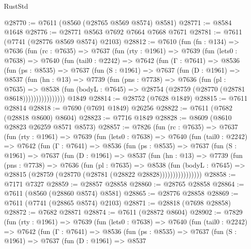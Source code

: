 \begin{lexlean}{RustStd}
\begin{coremodule}
@28770 := @7611 (@8560 (@28765 @8569 @8574) @8581)
@28771 := @8584 @1648
@28776 := @28771 @8563 @7692 @7664 @7668 @7671
@28781 := @7611 (@7741 (@28776 @8569 @8574) @2103)
@28812 := @7610
    (fun (fn : @134) =>
    @7636
      (fun (rc : @7635) =>
      @7637
        (fun (rty : @1961) =>
        @7639
          (fun (lets0 : @7638) =>
          @7640
            (fun (tail0 : @2242) =>
            @7642
              (fun (Γ : @7641) =>
              @8536
                (fun (ps : @8535) =>
                @7637
                  (fun (S : @1961) =>
                  @7637
                    (fun (D : @1961) =>
                    @8537
                      (fun (hn : @13) =>
                      @7739
                        (fun (pns : @7738) =>
                        @7636
                          (fun (pl : @7635) =>
                          @8538
                            (fun (bodyL : @7645) =>
                            @28754 (@28759 (@28770 (@28781 @8618))))))))))))))))
    @1849
@28814 := @28752 (@7628 @1849)
@28815 := @7611 @28814
@28818 := @7690 (@7691 @1849) @26256
@28822 := @7611 (@7682 (@28818 @8600) @8604)
@28823 := @7716 @1849
@28828 := @8609 (@8610 @28823 @26259 @8571 @8573)
@28857 := @7826
    (fun (rc : @7635) =>
    @7637
      (fun (rty : @1961) =>
      @7639
        (fun (lets0 : @7638) =>
        @7640
          (fun (tail0 : @2242) =>
          @7642
            (fun (Γ : @7641) =>
            @8536
              (fun (ps : @8535) =>
              @7637
                (fun (S : @1961) =>
                @7637
                  (fun (D : @1961) =>
                  @8537
                    (fun (hn : @13) =>
                    @7739
                      (fun (pns : @7738) =>
                      @7636
                        (fun (pl : @7635) =>
                        @8538
                          (fun (bodyL : @7645) =>
                          @28815 (@28759 (@28770 (@28781 (@28822 @28828))))))))))))))))
@28858 := @7171 @7327
@28859 := @28857 @28858
@28860 := @28765 @28858
@28864 := @7611 (@8560 (@28860 @8574) @8581)
@28865 := @28776 @28858
@28869 := @7611 (@7741 (@28865 @8574) @2103)
@28871 := @28818 (@7698 @28858)
@28872 := @7682 @28871
@28874 := @7611 (@28872 @8604)
@28902 := @7829
    (fun (rty : @1961) =>
    @7639
      (fun (lets0 : @7638) =>
      @7640
        (fun (tail0 : @2242) =>
        @7642
          (fun (Γ : @7641) =>
          @8536
            (fun (ps : @8535) =>
            @7637
              (fun (S : @1961) =>
              @7637
                (fun (D : @1961) =>
                @8537

\end{coremodule}
\end{lexlean}
